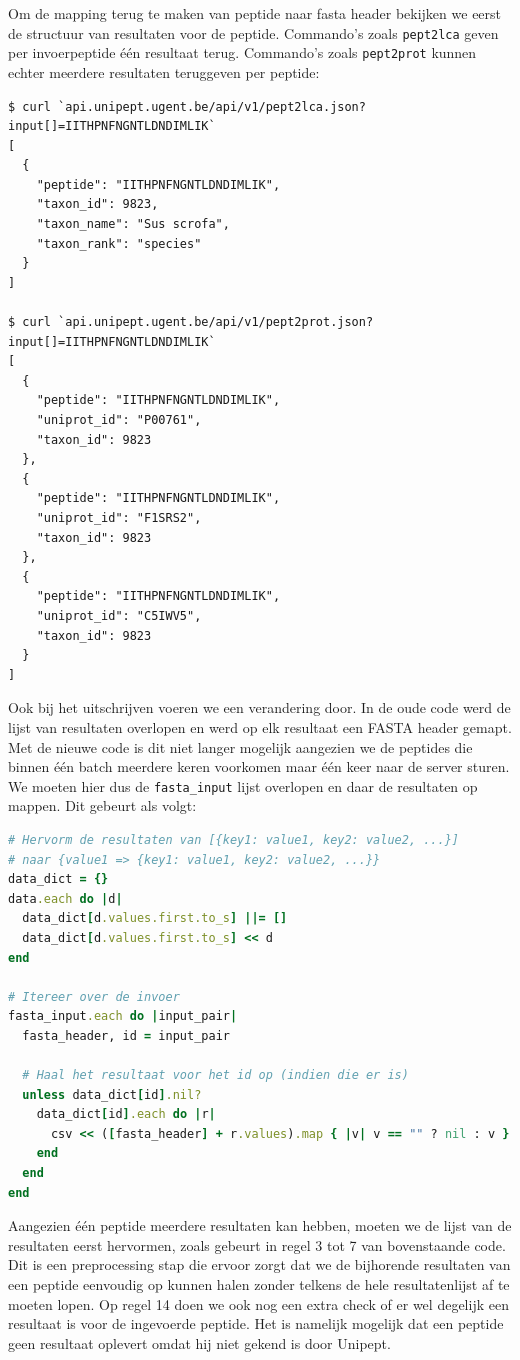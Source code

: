 Om de mapping terug te maken van peptide naar fasta header bekijken we eerst de
structuur van resultaten voor de peptide. Commando's zoals \texttt{pept2lca}
geven per invoerpeptide één resultaat terug. Commando's zoals \texttt{pept2prot}
kunnen echter meerdere resultaten teruggeven per peptide:

\begin{lstlisting}
$ curl `api.unipept.ugent.be/api/v1/pept2lca.json?input[]=IITHPNFNGNTLDNDIMLIK`
[
  {
    "peptide": "IITHPNFNGNTLDNDIMLIK",
    "taxon_id": 9823,
    "taxon_name": "Sus scrofa",
    "taxon_rank": "species"
  }
]

$ curl `api.unipept.ugent.be/api/v1/pept2prot.json?input[]=IITHPNFNGNTLDNDIMLIK`
[
  {
    "peptide": "IITHPNFNGNTLDNDIMLIK",
    "uniprot_id": "P00761",
    "taxon_id": 9823
  },
  {
    "peptide": "IITHPNFNGNTLDNDIMLIK",
    "uniprot_id": "F1SRS2",
    "taxon_id": 9823
  },
  {
    "peptide": "IITHPNFNGNTLDNDIMLIK",
    "uniprot_id": "C5IWV5",
    "taxon_id": 9823
  }
]
\end{lstlisting}

Ook bij het uitschrijven voeren we een verandering door. In de oude code werd 
de lijst van resultaten overlopen en werd op elk resultaat een FASTA header 
gemapt. Met de nieuwe code is dit niet langer mogelijk aangezien we de 
peptides die binnen één batch meerdere keren voorkomen maar één keer naar de 
server 
sturen. We moeten hier dus de \texttt{fasta\_input} lijst overlopen 
en daar de resultaten op mappen. Dit gebeurt als volgt:

\begin{lstlisting}[language=Ruby]
# Hervorm de resultaten van [{key1: value1, key2: value2, ...}]
# naar {value1 => {key1: value1, key2: value2, ...}}
data_dict = {}
data.each do |d|
  data_dict[d.values.first.to_s] ||= []
  data_dict[d.values.first.to_s] << d
end

# Itereer over de invoer
fasta_input.each do |input_pair|
  fasta_header, id = input_pair

  # Haal het resultaat voor het id op (indien die er is)
  unless data_dict[id].nil?
    data_dict[id].each do |r|
      csv << ([fasta_header] + r.values).map { |v| v == "" ? nil : v }
    end
  end
end
\end{lstlisting}

Aangezien één peptide meerdere resultaten kan hebben, moeten we de lijst van de
resultaten eerst hervormen, zoals gebeurt in regel 3 tot 7 van bovenstaande
code. Dit is een preprocessing stap die ervoor zorgt dat we de bijhorende
resultaten van een peptide eenvoudig op kunnen halen zonder telkens de hele
resultatenlijst af te moeten lopen. Op regel 14 doen we ook nog een 
extra check
of er wel degelijk een resultaat is voor de ingevoerde peptide. Het is
namelijk mogelijk dat een peptide geen resultaat oplevert omdat hij niet gekend
is door Unipept.

